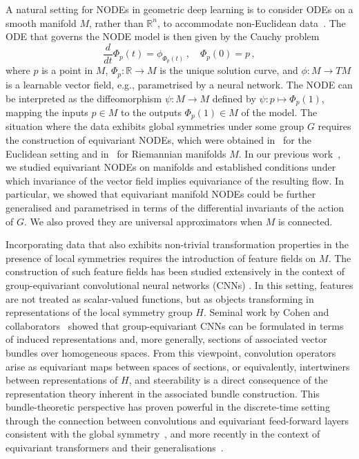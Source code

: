 \documentclass[12pt,a4paper]{article}
\numberwithin{equation}{section}
\theoremstyle{plain}
\theoremstyle{definition}
\theoremstyle{remark}
\begin{document}
A natural setting for NODEs in geometric deep learning is to consider ODEs on a smooth manifold $M$, rather than $\mathbb{R}^n$, to accommodate non-Euclidean data~\cite{Falorsi2020,Lou2020,Mathieu2020}. The ODE that governs the NODE model is then given by the Cauchy problem
\begin{equation}
\label{eqn:intro_manifold_NODE}
    \frac{d}{dt}\Phi_p(t) = \phi_{\Phi_p(t)} \,, \quad \Phi_p(0) = p \,,
\end{equation}
where $p$ is a point in $M$, $\Phi_p:\mathbb{R}\to M$ is the unique solution curve, and $\phi:M\to TM$ is a learnable vector field, e.g., parametrised by a neural network. The NODE can be interpreted as the diffeomorphism $\psi:M\to M$ defined by $\psi:p\mapsto \Phi_p(1)$, mapping the inputs $p\in M$ to the outputs $\Phi_p(1)\in M$ of the model. The situation where the data exhibits global symmetries under some group $G$ requires the construction of equivariant NODEs, which were obtained in~\cite{Kohler2020} for the Euclidean setting and in~\cite{Katsman2021} for Riemannian manifolds $M$. In our previous work~\cite{Andersdotter2025}, we studied equivariant NODEs on manifolds and established conditions under which invariance of the vector field implies equivariance of the resulting flow. In particular, we showed that equivariant manifold NODEs could be further generalised and parametrised in terms of the differential invariants of the action of $G$. We also proved they are universal approximators when $M$ is connected.

Incorporating data that also exhibits non-trivial transformation properties in the presence of local symmetries requires the introduction of feature fields on $M$. The construction of such feature fields has been studied extensively in the context of group-equivariant convolutional neural networks (CNNs) \cite{Cohen2019b,Cheng2019,Gerken2020}. In this setting, features are not treated as scalar-valued functions, but as objects transforming in representations of the local symmetry group $H$. Seminal work by Cohen and collaborators~\cite{Cohen2019b} showed that group-equivariant CNNs can be formulated in terms of induced representations and, more generally, sections of associated vector bundles over homogeneous spaces. From this viewpoint, convolution operators arise as equivariant maps between spaces of sections, or equivalently, intertwiners between representations of $H$, and steerability is a direct consequence of the representation theory inherent in the associated bundle construction. This bundle-theoretic perspective has proven powerful in the discrete-time setting through the connection between convolutions and equivariant feed-forward layers consistent with the global symmetry~\cite{Kondor2018,Aronsson2022}, and more recently in the context of equivariant transformers and their generalisations~\cite{Nyholm2025}.
\end{document}
